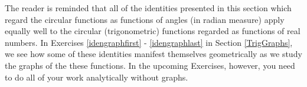 The reader is reminded that all of the identities presented in this section which regard the circular functions as functions of angles (in radian measure) apply equally well to the circular (trigonometric) functions regarded as functions of real numbers.  In Exercises \ref{idengraphfirst} - \ref{idengraphlast} in Section \ref{TrigGraphs}, we see how some of these identities manifest themselves geometrically as we study the graphs of the these functions.  In the upcoming Exercises, however, you need to do all of your work analytically without graphs.





